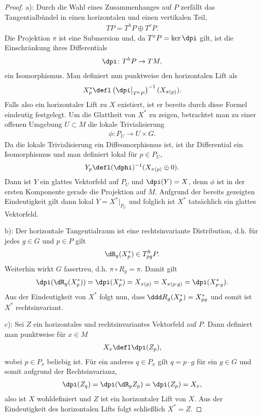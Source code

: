 \documentclass[%
	paper=a5,%
	fleqn,%
	DIV=18,%
	BCOR=0mm,
	fontsize=11pt,
	titlepage=false,%
	bibliography=totoc,
	DIV=18,%
	twoside=true,
	pdftitle=Riemannsche Geometrie,
	pdfauthor=Uwe Semmelmann,
	numbers=noendperiod]%
	{scrbook}
\begin{document}
\begin{proof}
a): Durch die Wahl eines Zusammenhanges auf $P$ zerfällt das Tangentialbündel in
einen horizontalen und einen vertikalen Teil,
\begin{align*}
TP = T^hP \oplus T^vP.
\end{align*}
Die Projektion $\pi$ ist eine Submersion und, da $T^vP = \ker \dpi$ gilt, ist
die Einschränkung ihres Differentials
\begin{align*}
\dpi\colon T^hP \to TM,
\end{align*}
ein Isomorphismus. Man definiert nun punktweise den horizontalen Lift als
\begin{align*}
X^*_p \defl \left(\dpi\big|_{T^hP}\right)^{-1}(X_{\pi(p)}).
\end{align*}
Falls also ein horizontaler Lift zu $X$ existiert, ist er bereits durch
diese Formel eindeutig festgelegt. Um die Glattheit von $X^*$ zu zeigen,
betrachtet man zu einer offenen Umgebung $U\subset M$ die lokale
Trivialisierung
\begin{align*}
\phi\colon P_U\to U\times G.
\end{align*}
Da die lokale Trivialisierung ein Diffeomorphismus ist, ist ihr Differential ein
Isomorphismus und man definiert lokal für $p\in P_U$,
\begin{align*}
Y_p \defl (\dphi)^{-1}(X_{\pi(p)}\oplus 0).
\end{align*}
Dann ist $Y$ ein glattes Vektorfeld auf $P_U$ und $\dpi(Y) = X$, denn $\phi$ ist
in der ersten Komponente gerade die Projektion auf $M$. Aufgrund der bereits
gezeigten Eindeutigkeit gilt dann lokal $Y = X^*\big|_{P_U}$ und folglich ist
$X^*$ tatsächlich ein glattes Vektorfeld.

b): Der horizontale Tangentialraum ist eine rechtsinvariante Distribution, d.h.
für jedes $g\in G$ und $p\in P$ gilt
\begin{align*}
\dR_g (X^*_p) \in T_{pg}^h P.
\end{align*}
Weiterhin wirkt $G$ fasertreu, d.h. $\pi\circ R_g = \pi$. Damit gilt
\begin{align*}
\dpi( \dR_g (X_p^*)) = \dpi(X_p^*) = X_{\pi(p)} = X_{\pi(p\cdot g)} = \dpi(X^*_{p\cdot g}).
\end{align*}
Aus der Eindeutigkeit von $X^*$ folgt nun, dass $\ddd R_g(X^*_p) = X_{pg}^*$
und somit ist $X^*$ rechtsinvariant.

c): Sei $Z$ ein horizontales und rechtsinvariantes Vektorfeld auf $P$. Dann
definiert man punktweise für $x\in M$
\begin{align*}
X_x \defl \dpi(Z_p),
\end{align*}
wobei $p\in P_x$ beliebig ist. Für ein anderes $q\in P_x$ gilt $q = p\cdot g$
für ein $g\in G$ und somit aufgrund der Rechtsinvarianz,
\begin{align*}
\dpi(Z_q) = \dpi(\dR_g Z_p) = \dpi(Z_p) = X_x,
\end{align*}
also ist $X$ wohldefiniert und $Z$ ist ein horizontaler Lift von $X$. Aus der Eindeutigkeit des horizontalen Lifts
folgt schließlich $X^* = Z$.


\end{proof}
\end{document}
